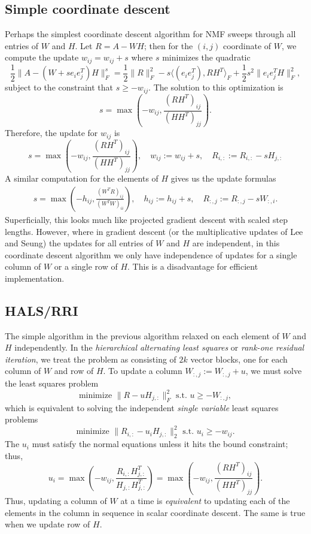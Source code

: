 \documentclass[12pt, leqno]{article} %
\begin{document}
\subsection{Simple coordinate descent}

Perhaps the simplest coordinate descent algorithm for NMF sweeps
through all entries of $W$ and $H$.  Let $R = A-WH$; then for the
$(i,j)$ coordinate of $W$, we compute the update
$w_{ij} = w_{ij} + s$ where $s$ minimizes the quadratic
\[
\frac{1}{2} \|A-(W+se_i e_j^T) H\|_F^s =
\frac{1}{2} \|R\|_F^2 -
s \langle (e_i e_j^T) , RH^T \rangle_F +
\frac{1}{2} s^2 \|e_i e_j^T H\|_F^2,
\]
subject to the constraint that $s \geq -w_{ij}$.  The solution to
this optimization is
\[
  s = \max\left( -w_{ij}, \frac{(RH^T)_{ij}}{(HH^T)_{jj}} \right).
\]
Therefore, the update for $w_{ij}$ is
\[
  s = \max\left( -w_{ij}, \frac{(RH^T)_{ij}}{(HH^T)_{jj}} \right), \quad
  w_{ij} := w_{ij} + s, \quad
  R_{i,:} := R_{i,:} - s H_{j,:}
\]
A similar computation for the elements of $H$ gives us the update formulas
\begin{align*}
  s = \max\left( -h_{ij}, \frac{(W^TR)_{ij}}{(W^TW)_{ii}} \right), \quad
  h_{ij} := h_{ij} + s, \quad
  R_{:,j} := R_{:,j} - s W_{:,i}.
\end{align*}
Superficially, this looks much like projected gradient descent with
scaled step lengths.  However, where in gradient descent (or the
multiplicative updates of Lee and Seung) the updates for all entries
of $W$ and $H$ are independent, in this coordinate descent algorithm
we only have independence of updates for a single column of $W$ or a
single row of $H$.  This is a disadvantage for efficient implementation.

\subsection{HALS/RRI}

The simple algorithm in the previous algorithm relaxed on each element
of $W$ and $H$ independently.  In the
{\em hierarchical alternating least squares} or
{\em rank-one residual iteration}, we treat the problem as consisting
of $2k$ vector blocks, one for each column of $W$ and row of $H$.
To update a column $W_{:,j} := W_{:,j} + u$, we must solve the least
squares problem
\[
  \mbox{minimize } \|R-u H_{j,:}\|_F^2 \mbox{ s.t.~} u \geq -W_{:,j},
\]
which is equivalent to solving the independent {\em single variable}
least squares problems
\[
  \mbox{minimize } \|R_{i,:}-u_i H_{j,:}\|_2^2 \mbox{~s.t.~} u_i \geq -w_{ij}.
\]
The $u_i$ must satisfy the normal equations unless it hits the bound
constraint; thus,
\[
  u_i
  = \max\left( -w_{ij}, \frac{R_{i,:} H_{j,:}^T}{H_{j,:} H_{j,:}^T}
    \right)
  = \max\left( -w_{ij}, \frac{(RH^T)_{ij}}{(HH^T)_{jj}} \right).    
\]
Thus, updating a column of $W$ at a time is {\em equivalent} to
updating each of the elements in the column in sequence in
scalar coordinate descent.  The same is true when we update row
of $H$.
\end{document}
